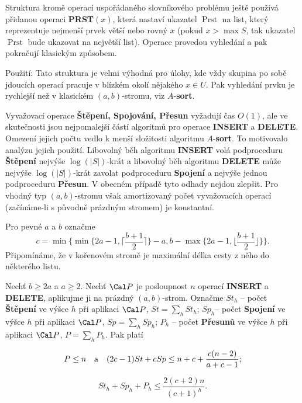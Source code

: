 \documentclass[a4paper,12pt]{article}
\def \emph#1{\underbar{#1}}
\DeclareMathOperator*{\Prst}{Prst}
\begin{document}
Struktura kromě operací uspořádaného 
slovníkového prob\-lé\-mu 
ještě používá přidanou ope\-raci {\bf PRST$(x)$}, která nastaví ukazatel 
$\Prst$ na list, který reprezentuje nejmenší prvek větší 
nebo rovný $x$ (pokud $x>\max S$, tak ukazatel $\Prst$ bude 
ukazovat na největší list). Operace provedou vyhledání a 
pak pokračují klasickým způsobem.

Použití: Tato struktura je velmi výhodná pro 
úlohy, kde vždy skupina po sobě jdoucích ope\-rací  
pracuje v blízkém okolí něja\-ké\-ho $x\in U$. Pak 
vyhledání prvku je rychlejší než v klasickém 
$(a,b)$-stromu, viz $A$-{\bf sort}.

Vyvažovací operace {\bf Štěpení, Spojování, Přesun }
vyžadují čas $O(1)$, ale ve skutečnosti jsou nejpomalejší 
částí 
algoritmů pro operace {\bf INSERT} a {\bf DELETE}.  Omezení 
jejich počtu vedlo k menší složitosti algoritmu $A$-{\bf sort}.  To motivovalo analýzu 
jejich použití.\newline 
Libovolný běh algoritmu {\bf INSERT }
volá podproceduru {\bf Štěpe\-ní} nejvýše $\log(|
S|)$-krát a libovolný běh 
algoritmu  {\bf DELETE} mů\-že nejvýše $\log(|S|
)$-krát zavolat podproceduru 
{\bf Spojení }
a nejvýše jednou podproceduru {\bf Přesun}.  V obecném 
případě tyto od\-ha\-dy nejdou zlepšit.  Pro vhodný typ 
$(a,b)$-stromu však amortizovaný počet vyvažovacích 
ope\-rací (začínáme-li s  
pů\-vod\-ně práz\-dným stromem) je konstantní.

Pro pevné $a$ a $b$ označme 
$$c=\min\{\min\{2a-1,\lceil\frac {b+1}2\rceil \}-a,b-\max\{2a-1,\lfloor\frac {
b+1}2\rfloor \}\}.$$
Připomínáme, že \emph{výška} \emph{vrcholu} v kořenovém stromě je 
maximální délka cesty z něho do některého listu.

Nechť $b\ge 2a$ a $a\ge 2$. Nechť $\Cal P$ je 
posloupnost $n$ operací {\bf INSERT} a {\bf DELETE}, aplikujme ji na 
prázdný $(a,b)$-strom. Označme\newline 
$St_h$ -- počet {\bf Štěpení} ve výšce $h$ při aplikaci $
\Cal P$, $St=\sum_hSt_h$;\newline 
$Sp_h$-- počet {\bf Spojení} ve výšce $h$ při aplikaci $
\Cal P$, 
$Sp=\sum_hSp_h$;\newline 
$P_h$ -- počet {\bf Přesunů} ve výšce $h$ při aplikaci $
\Cal P$, 
$P=\sum_hP_h$.\newline 
Pak platí
\roster
\item
$$P\le n\quad \text{\rm a}\quad (2c-1)St+cSp\le n+c+\frac {c(n-2)}{a+c-1};$$
\item
$$St_h+Sp_h+P_h\le\frac {2(c+2)n}{(c+1)^h}.$$
\endroster
\endproclaim
\end{document}
